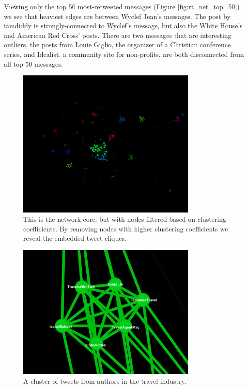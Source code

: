 \documentclass[a4paper, 11pt, titlepage]{article}
\begin{document}
Viewing only the top 50 most-retweeted messages (Figure \ref{fig:rt_net_top_50}) we see that heaviest edges are between Wyclef Jean's messages.  The post by iamdiddy is strongly-connected to Wyclef's message, but also the White House's and American Red Cross' posts.  There are two messages that are interesting outliers, the posts from Louie Giglio, the organizer of a Christian conference series, and Idealist, a community site for non-profits, are both disconnected from all top-50 messages.

\begin{figure}[h]
\centering
\label{fig:rt_net_core_clusters}
\includegraphics[width=90mm]{../figures/rt_net_core_clusters}
\caption{This is the network core, but with nodes filtered based on clustering coefficients.  By removing nodes with higher clustering coefficients we reveal the embedded tweet cliques.}
\end{figure}

\begin{figure}[h]
\centering
\includegraphics[width=90mm]{../figures/rt_net_travel}
\caption{A cluster of tweets from authors in the travel industry.}
\label{fig:rt_net_travel}
\end{figure}
\end{document}
